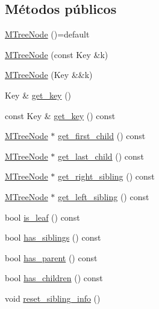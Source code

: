 \subsection*{Métodos públicos}
\begin{DoxyCompactItemize}
\item 
\hyperlink{class_designar_1_1_m_tree_node_a8312cbf8769f92de4348c69f9f7fce40}{M\+Tree\+Node} ()=default
\item 
\hyperlink{class_designar_1_1_m_tree_node_a823994c2cdeba2768bdb10163f27a6b1}{M\+Tree\+Node} (const Key \&k)
\item 
\hyperlink{class_designar_1_1_m_tree_node_abee75a0ea8366fe1f815afddc4b18163}{M\+Tree\+Node} (Key \&\&k)
\item 
Key \& \hyperlink{class_designar_1_1_m_tree_node_a6bccdf14efbc480aaa4d23c943b5a100}{get\+\_\+key} ()
\item 
const Key \& \hyperlink{class_designar_1_1_m_tree_node_aaf4dc39561e8db6973db9c1b5a88b466}{get\+\_\+key} () const
\item 
\hyperlink{class_designar_1_1_m_tree_node}{M\+Tree\+Node} $\ast$ \hyperlink{class_designar_1_1_m_tree_node_a4e9b81f97d9f471a44e4fb84b1bb224b}{get\+\_\+first\+\_\+child} () const
\item 
\hyperlink{class_designar_1_1_m_tree_node}{M\+Tree\+Node} $\ast$ \hyperlink{class_designar_1_1_m_tree_node_a6b2089185feed25ae434f46584b83ffc}{get\+\_\+last\+\_\+child} () const
\item 
\hyperlink{class_designar_1_1_m_tree_node}{M\+Tree\+Node} $\ast$ \hyperlink{class_designar_1_1_m_tree_node_a1da0c771ce14330be0e13716c242a0a3}{get\+\_\+right\+\_\+sibling} () const
\item 
\hyperlink{class_designar_1_1_m_tree_node}{M\+Tree\+Node} $\ast$ \hyperlink{class_designar_1_1_m_tree_node_a10ec8a3f078b1f3d63773ca16602719c}{get\+\_\+left\+\_\+sibling} () const
\item 
bool \hyperlink{class_designar_1_1_m_tree_node_a51d59eaaff91520cbf9b7d255a420a06}{is\+\_\+leaf} () const
\item 
bool \hyperlink{class_designar_1_1_m_tree_node_a2dfae442a5cffced27a7e1f106f3821f}{has\+\_\+siblings} () const
\item 
bool \hyperlink{class_designar_1_1_m_tree_node_a22503a2ccff5be2659b4af0df4822275}{has\+\_\+parent} () const
\item 
bool \hyperlink{class_designar_1_1_m_tree_node_ae3f1add8565b20f3957e512c9d64cea1}{has\+\_\+children} () const
\item 
void \hyperlink{class_designar_1_1_m_tree_node_a7bbcaf3f2dc77eaf4c593e64ca20c5f0}{reset\+\_\+sibling\+\_\+info} ()

\end{DoxyCompactItemize}
